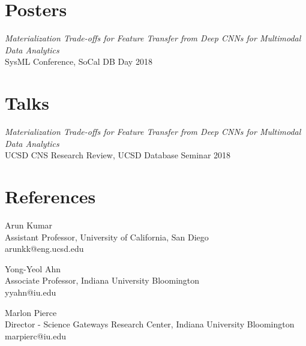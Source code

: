 \documentclass[margin]{res}
\begin{document}
\begin{resume}
\section{Posters}
\textit{Materialization Trade-offs for Feature Transfer from Deep CNNs for Multimodal Data Analytics} \\
SysML Conference, SoCal DB Day \hfill 2018

\section{Talks}
\textit{Materialization Trade-offs for Feature Transfer from Deep CNNs for Multimodal Data Analytics}
\\
UCSD CNS Research Review, UCSD Database Seminar \hfill 2018
\section{References}
Arun Kumar \\
Assistant Professor, University of California, San Diego \\
arunkk@eng.ucsd.edu

Yong-Yeol Ahn \\
Associate Professor, Indiana University Bloomington \\
yyahn@iu.edu 

Marlon Pierce \\
Director - Science Gateways Research Center, Indiana University Bloomington \\
marpierc@iu.edu
\end{resume}
\end{document}
